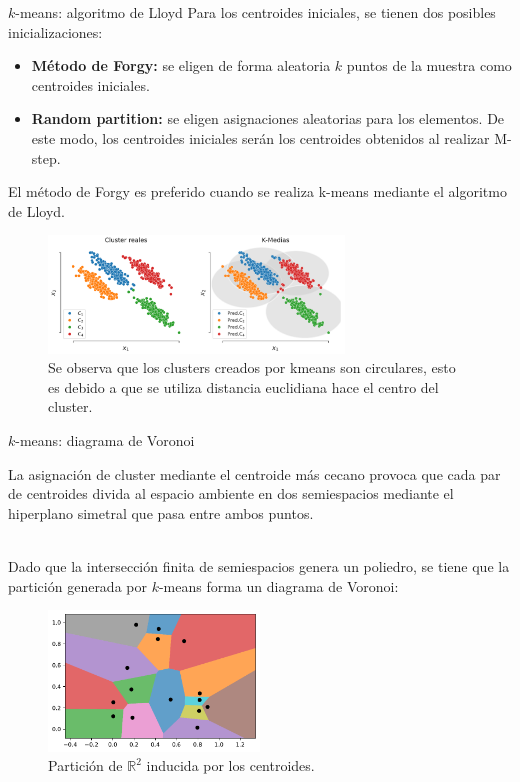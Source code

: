 \documentclass[handout, 9pt]{beamer}
\begin{document}
\begin{frame}{$k$-means: algoritmo de Lloyd}
	Para los centroides iniciales, se tienen dos posibles inicializaciones:

\begin{itemize}
	\item \textbf{Método de Forgy:} se eligen de forma aleatoria $k$ puntos de la muestra como centroides iniciales.\pause
	\item \textbf{Random partition:} se eligen asignaciones aleatorias para los elementos. De este modo, los centroides iniciales serán los centroides obtenidos al realizar M-step.\pause
\end{itemize}

El método de Forgy es preferido cuando se realiza k-means mediante el algoritmo de Lloyd.\pause

\begin{figure}[h]
  \centering
  \includegraphics[width=0.7\textwidth]{../img/cap6_k_medias}
  \caption{Se observa que los clusters creados por kmeans son circulares, esto es debido a que se utiliza distancia euclidiana hace el centro del cluster.}
  \label{fig:kmeans}
\end{figure}

\end{frame}


\begin{frame}{$k$-means: diagrama de Voronoi}
	
La asignación de cluster mediante el centroide más cecano provoca que cada par de centroides divida al espacio ambiente en dos semiespacios mediante el hiperplano simetral que pasa entre ambos puntos. \\~\ \pause

Dado que la intersección finita de semiespacios genera un poliedro, se tiene que la partición generada por $k$-means forma un diagrama de Voronoi:

\begin{figure}[h]
  \centering
  \includegraphics[width=0.5\textwidth]{../img/cap6_voronoi}
  \caption{Partición de $\mathbb{R}^2$ inducida por los centroides.}
  \label{fig:kmeans_voronoi}
\end{figure}

\end{frame}
\end{document}
